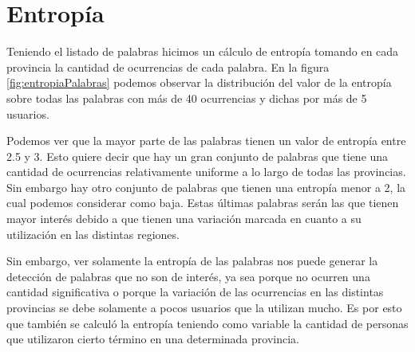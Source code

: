







\section{Entropía}
Teniendo el listado de palabras hicimos un cálculo de entropía tomando en cada provincia la cantidad de ocurrencias de cada palabra. En la figura \ref{fig:entropiaPalabras} podemos observar la distribución del valor de la entropía sobre todas las palabras con más de 40 ocurrencias y dichas por más de 5 usuarios.

Podemos ver que la mayor parte de las palabras tienen un valor de entropía entre 2.5 y 3. Esto quiere decir que hay un gran conjunto de palabras que tiene una cantidad de ocurrencias relativamente uniforme a lo largo de todas las provincias. Sin embargo hay otro conjunto de palabras que tienen una entropía menor a 2, la cual podemos considerar como baja. Estas últimas palabras serán las que tienen mayor interés debido a que tienen una variación marcada en cuanto a su utilización en las distintas regiones.

Sin embargo, ver solamente la entropía de las palabras nos puede generar la detección de palabras que no son de interés, ya sea porque no ocurren una cantidad significativa o porque la variación de las ocurrencias en las distintas provincias se debe solamente a pocos usuarios que la utilizan mucho. Es por esto que también se calculó la entropía teniendo como variable la cantidad de personas que utilizaron cierto término en una determinada provincia.


